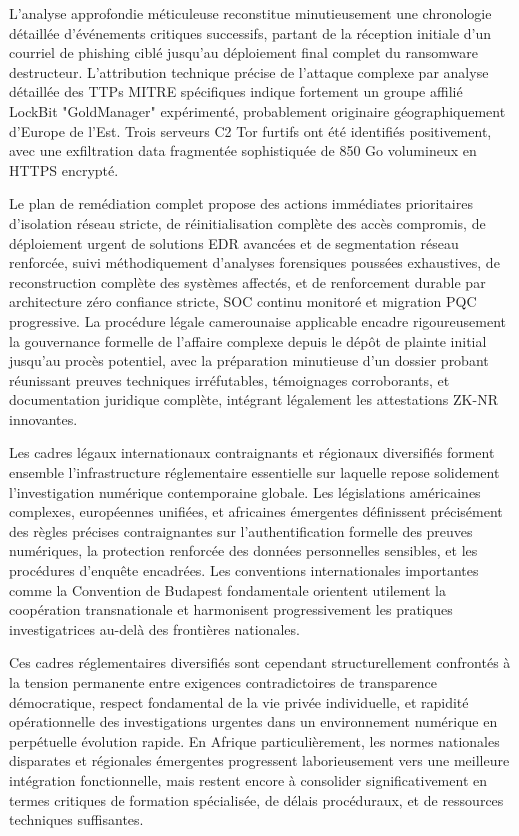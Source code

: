\documentclass[12pt, a4paper]{article}
\begin{document}
	\medskip
	L'analyse approfondie méticuleuse reconstitue minutieusement une chronologie détaillée d'événements critiques successifs, partant de la réception initiale d'un courriel de phishing ciblé jusqu'au déploiement final complet du ransomware destructeur. L'attribution technique précise de l'attaque complexe par analyse détaillée des TTPs MITRE spécifiques indique fortement un groupe affilié LockBit "GoldManager" expérimenté, probablement originaire géographiquement d'Europe de l'Est. Trois serveurs C2 Tor furtifs ont été identifiés positivement, avec une exfiltration data fragmentée sophistiquée de 850 Go volumineux en HTTPS encrypté.
	
	Le plan de remédiation complet propose des actions immédiates prioritaires d'isolation réseau stricte, de réinitialisation complète des accès compromis, de déploiement urgent de solutions EDR avancées et de segmentation réseau renforcée, suivi méthodiquement d'analyses forensiques poussées exhaustives, de reconstruction complète des systèmes affectés, et de renforcement durable par architecture zéro confiance stricte, SOC continu monitoré et migration PQC progressive. La procédure légale camerounaise applicable encadre rigoureusement la gouvernance formelle de l'affaire complexe depuis le dépôt de plainte initial jusqu'au procès potentiel, avec la préparation minutieuse d'un dossier probant réunissant preuves techniques irréfutables, témoignages corroborants, et documentation juridique complète, intégrant légalement les attestations ZK-NR innovantes.
	
	\medskip
	Les cadres légaux internationaux contraignants et régionaux diversifiés forment ensemble l'infrastructure réglementaire essentielle sur laquelle repose solidement l'investigation numérique contemporaine globale. Les législations américaines complexes, européennes unifiées, et africaines émergentes définissent précisément des règles précises contraignantes sur l'authentification formelle des preuves numériques, la protection renforcée des données personnelles sensibles, et les procédures d'enquête encadrées. Les conventions internationales importantes comme la Convention de Budapest fondamentale orientent utilement la coopération transnationale et harmonisent progressivement les pratiques investigatrices au-delà des frontières nationales.
	
	Ces cadres réglementaires diversifiés sont cependant structurellement confrontés à la tension permanente entre exigences contradictoires de transparence démocratique, respect fondamental de la vie privée individuelle, et rapidité opérationnelle des investigations urgentes dans un environnement numérique en perpétuelle évolution rapide. En Afrique particulièrement, les normes nationales disparates et régionales émergentes progressent laborieusement vers une meilleure intégration fonctionnelle, mais restent encore à consolider significativement en termes critiques de formation spécialisée, de délais procéduraux, et de ressources techniques suffisantes.
	
\end{document}
